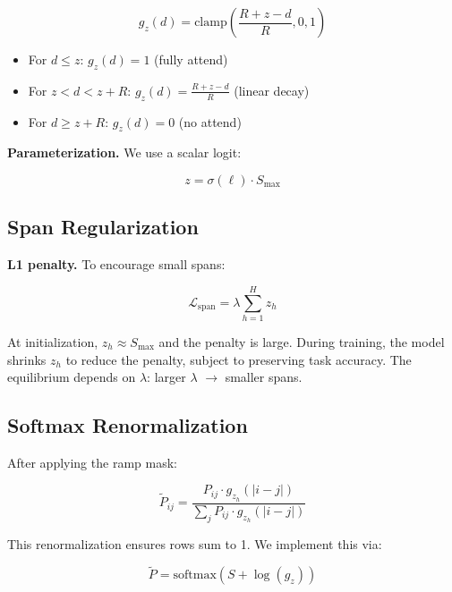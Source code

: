 \begin{equation}
g_z(d) = \text{clamp}\!\left(\frac{R + z - d}{R}, 0, 1\right)
\end{equation}

\begin{itemize}
\item For $d \leq z$: $g_z(d) = 1$ (fully attend)
\item For $z < d < z + R$: $g_z(d) = \frac{R + z - d}{R}$ (linear decay)
\item For $d \geq z + R$: $g_z(d) = 0$ (no attend)

\end{itemize}
\textbf{Parameterization.} We use a scalar logit:

\begin{equation}
z = \sigma(\ell) \cdot S_\text{max}
\end{equation}

\subsection{Span Regularization}

\textbf{L1 penalty.} To encourage small spans:

\begin{equation}
\mathcal{L}_\text{span} = \lambda \sum_{h=1}^H z_h
\end{equation}

At initialization, $z_h \approx S_\text{max}$ and the penalty is large. During 
training, the model shrinks $z_h$ to reduce the penalty, subject to preserving 
task accuracy. The equilibrium depends on $\lambda$: larger $\lambda$ $\to$ 
smaller spans.

\subsection{Softmax Renormalization}

After applying the ramp mask:

\begin{equation}
\tilde{P}_{ij} = \frac{P_{ij} \cdot g_{z_h}(|i - j|)}{\sum_j P_{ij} \cdot g_{z_h}(|i - j|)}
\end{equation}

This renormalization ensures rows sum to 1. We implement this via:

\begin{equation}
\tilde{P} = \text{softmax}(S + \log(g_z))
\end{equation}

